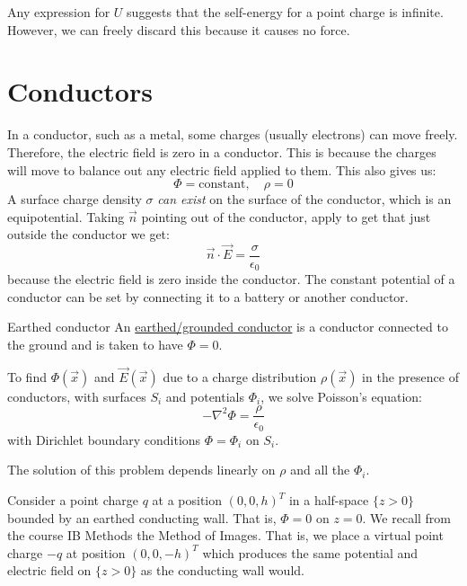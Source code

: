 \documentclass[../Main.tex]{subfiles}
\begin{document}
Any expression for $U$ suggests that the self-energy for a point charge is infinite. However, we can freely discard this because it causes no force.
\section{Conductors}
In a conductor, such as a metal, some charges (usually electrons) can move freely. Therefore, the electric field is zero in a conductor. This is because the charges will move to balance out any electric field applied to them. This also gives us:
\begin{equation*}
    \Phi = \text{constant},\quad \rho = 0
\end{equation*}
A surface charge density $\sigma$ \textit{can exist} on the surface of the conductor, which is an equipotential. Taking $\vec{n}$ pointing out of the conductor, apply  to get that just outside the conductor we get:
\begin{equation*}
    \vec{n} \cdot \vec{E} = \frac{\sigma}{\epsilon_0}
\end{equation*}
because the electric field is zero inside the conductor. The constant potential of a conductor can be set by connecting it to a battery or another conductor.
\begin{definition}{Earthed conductor}
    An \underline{earthed/grounded conductor} is a conductor connected to the ground and is taken to have $\Phi = 0$.
\end{definition}
To find $\Phi(\vec{x})$ and $\vec{E}(\vec{x})$ due to a charge distribution $\rho(\vec{x})$ in the presence of conductors, with surfaces $S_i$ and potentials $\Phi_i$, we solve Poisson's equation:
\begin{equation*}
    - \nabla^2 \Phi = \frac{\rho}{\epsilon_0}
\end{equation*}
with Dirichlet boundary conditions $\Phi = \Phi_i$ on $S_i$.
\begin{remark}
    The solution of this problem depends linearly on $\rho$ and all the $\Phi_i$.
\end{remark}
\begin{example}
    Consider a point charge $q$ at a position $(0, 0, h)^T$ in a half-space $\{z > 0\}$ bounded by an earthed conducting wall. That is, $\Phi = 0$ on $z = 0$. We recall from the course IB Methods the Method of Images. That is, we place a virtual point charge $-q$ at position $(0, 0, -h)^T$ which produces the same potential and electric field on $\{z > 0\}$ as the conducting wall would.
\end{example}
\end{document}
